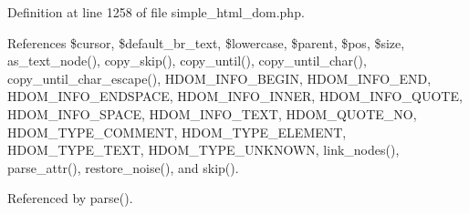 Definition at line 1258 of file simple\+\_\+html\+\_\+dom.\+php.



References \$cursor, \$default\+\_\+br\+\_\+text, \$lowercase, \$parent, \$pos, \$size, as\+\_\+text\+\_\+node(), copy\+\_\+skip(), copy\+\_\+until(), copy\+\_\+until\+\_\+char(), copy\+\_\+until\+\_\+char\+\_\+escape(), H\+D\+O\+M\+\_\+\+I\+N\+F\+O\+\_\+\+B\+E\+G\+I\+N, H\+D\+O\+M\+\_\+\+I\+N\+F\+O\+\_\+\+E\+N\+D, H\+D\+O\+M\+\_\+\+I\+N\+F\+O\+\_\+\+E\+N\+D\+S\+P\+A\+C\+E, H\+D\+O\+M\+\_\+\+I\+N\+F\+O\+\_\+\+I\+N\+N\+E\+R, H\+D\+O\+M\+\_\+\+I\+N\+F\+O\+\_\+\+Q\+U\+O\+T\+E, H\+D\+O\+M\+\_\+\+I\+N\+F\+O\+\_\+\+S\+P\+A\+C\+E, H\+D\+O\+M\+\_\+\+I\+N\+F\+O\+\_\+\+T\+E\+X\+T, H\+D\+O\+M\+\_\+\+Q\+U\+O\+T\+E\+\_\+\+N\+O, H\+D\+O\+M\+\_\+\+T\+Y\+P\+E\+\_\+\+C\+O\+M\+M\+E\+N\+T, H\+D\+O\+M\+\_\+\+T\+Y\+P\+E\+\_\+\+E\+L\+E\+M\+E\+N\+T, H\+D\+O\+M\+\_\+\+T\+Y\+P\+E\+\_\+\+T\+E\+X\+T, H\+D\+O\+M\+\_\+\+T\+Y\+P\+E\+\_\+\+U\+N\+K\+N\+O\+W\+N, link\+\_\+nodes(), parse\+\_\+attr(), restore\+\_\+noise(), and skip().



Referenced by parse().


